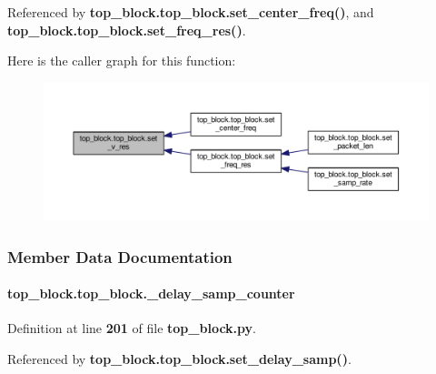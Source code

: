 Referenced by {\bf top\+\_\+block.\+top\+\_\+block.\+set\+\_\+center\+\_\+freq()}, and {\bf top\+\_\+block.\+top\+\_\+block.\+set\+\_\+freq\+\_\+res()}.



Here is the caller graph for this function\+:
\nopagebreak
\begin{figure}[H]
\begin{center}
\leavevmode
\includegraphics[width=350pt]{d7/db3/classtop__block_1_1top__block_a79309627e38dc17e7a66baa643e689de_icgraph}
\end{center}
\end{figure}




\subsubsection{Member Data Documentation}
\paragraph[{\+\_\+delay\+\_\+samp\+\_\+counter}]{\setlength{\rightskip}{0pt plus 5cm}top\+\_\+block.\+top\+\_\+block.\+\_\+delay\+\_\+samp\+\_\+counter\hspace{0.3cm}{\ttfamily [private]}}\label{classtop__block_1_1top__block_a6ba3c203790609b1f7d4f58bd7242ef7}


Definition at line {\bf 201} of file {\bf top\+\_\+block.\+py}.



Referenced by {\bf top\+\_\+block.\+top\+\_\+block.\+set\+\_\+delay\+\_\+samp()}.

